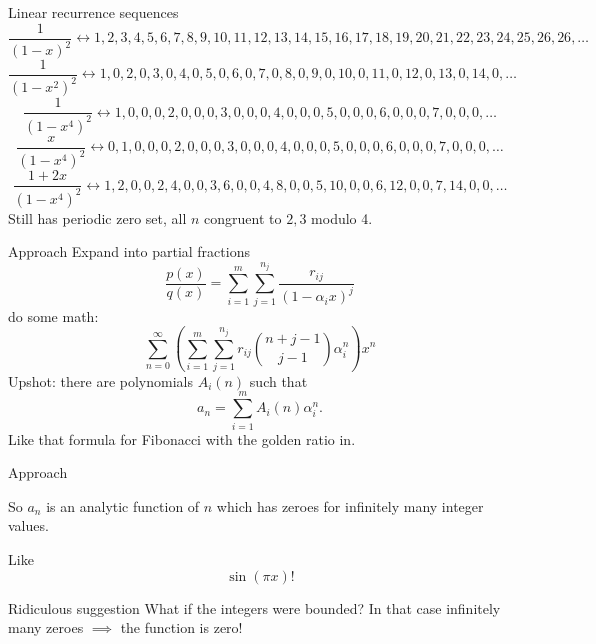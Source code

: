\documentclass[notheorems]{beamer}
\theoremstyle{plain}
\theoremstyle{definition}
\theoremstyle{definition}
\theoremstyle{definition}
\begin{document}
\begin{frame}{Linear recurrence sequences}
\begin{equation*}
	\frac{1}{(1-x)^2} \leftrightarrow 1,2,3,4,5,6,7,8,9,10,11,12,13,14,15,16,17,18,19,20,21,22,23,24,25,26,26,\ldots
\end{equation*}
\begin{equation*}
	\frac{1}{(1-x^2)^2} \leftrightarrow 1,0,2,0,3,0,4,0,5,0,6,0,7,0,8,0,9,0,10,0,11,0,12,0,13,0,14,0,\ldots
\end{equation*}
\begin{equation*}
\frac{1}{(1-x^4)^2} \leftrightarrow 1,0,0,0,2,0,0,0,3,0,0,0,4,0,0,0,5,0,0,0,6,0,0,0,7,0,0,0,\ldots
\end{equation*}
\pause
%
\begin{equation*}
\frac{x}{(1-x^4)^2} \leftrightarrow 0,1,0,0,0,2,0,0,0,3,0,0,0,4,0,0,0,5,0,0,0,6,0,0,0,7,0,0,0,\ldots
\end{equation*}
\pause
%
\begin{equation*}
\frac{1+2x}{(1-x^4)^2} \leftrightarrow 1,2,0,0,2,4,0,0,3,6,0,0,4,8,0,0,5,10,0,0,6,12,0,0,7,14,0,0,\ldots
\end{equation*}
\pause
Still has periodic zero set, all \(n\) congruent to \(2,3\) modulo 4.%
\par
\end{frame}

\begin{frame}{Approach}
Expand into partial fractions%
\begin{equation*}
\frac{p(x)}{q(x)} = \sum_{i = 1}^m \sum_{j=1}^{n_j} \frac{r_{ij}}{(1-\alpha_i x)^j}
\end{equation*}
\pause
do some math:
\begin{equation*}
\sum_{n=0}^\infty \left(\sum_{i = 1}^m \sum_{j=1}^{n_j} r_{ij} \binom{n+j-1}{j-1}  \alpha_i^n\right) x^n
\end{equation*}
\pause
Upshot: there are polynomials \(A_i(n)\) such that%
\begin{equation*}
a_n = \sum_{i=1}^m A_i(n)\alpha_i^n\text{.}
\end{equation*}
Like that formula for Fibonacci with the golden ratio in.
\end{frame}

\begin{frame}{Approach}

So \(a_n\) is an analytic function of \(n\) which has zeroes for infinitely many integer values.
\par\pause
Like \[\sin(\pi x)!\]
\par\pause
\begin{alertblock}{Ridiculous suggestion}
What if the integers were bounded? In that case infinitely many zeroes \(\implies\) the function is zero!
\end{alertblock}
\end{frame}
\end{document}
